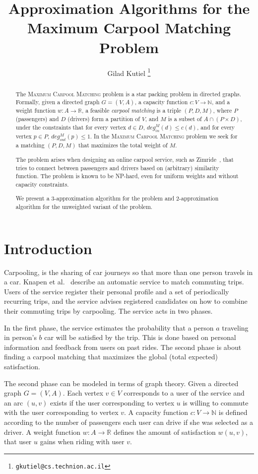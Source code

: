\documentclass[draft]{article}
\title{Approximation Algorithms for the Maximum Carpool Matching Problem}
\date{}
\author[1]{Gilad Kutiel			\thanks{\texttt{gkutiel@cs.technion.ac.il}}}
\affil[1]{Department of Computer Science, Technion, Haifa, Israel}
\def\R{\mathbb{R}}
\def\N{\mathbb{N}}
\newcommand{\din}[1][M]{deg^M_{in}}
\newcommand{\dout}[1][M]{deg^M_{out}}
\def\CARPOOL{Maximum Carpool Ma\-tching}
\begin{document}
\maketitle

\begin{abstract}
The \textsc{\CARPOOL{}} problem is a star packing problem in directed graphs.
Formally, given a directed graph $G = (V, A)$,
a capacity function $ c: V \rightarrow \N $,
and a weight function $w : A \rightarrow \R $,
a feasible \emph{carpool matching} is a triple 
$(P, D, M)$, where $P$ (passengers) and $D$ (drivers) form a partition of $V$, 
and $M$ is a subset of $A \cap (P \times D)$,
under the constraints that for every vertex $d \in D$, 
$\din(d) \leq c(d)$, 
and for every vertex $p \in P$, $\dout(p) \leq 1$.
In the \textsc{\CARPOOL{}} problem we seek for a matching $(P, D, M)$ that maximizes the
total weight of $M$.

The problem arises when designing an online carpool service, 
such as Zimride~\cite{zimride}, 
that tries to connect between passengers and drivers based on (arbitrary) similarity function.
The problem is known to be NP-hard, 
even for uniform weights and without capacity constraints.

We present a $3$-approximation algorithm for the problem
and $2$-approximation algorithm for the unweighted variant of the problem.
\end{abstract}

\section{Introduction}
Carpooling, is the sharing of car journeys so that more than one person travels
in a car.
Knapen et al.~\cite{knapen2013estimating} describe an automatic service
to match commuting trips.
Users of the service register their personal profile and a set of periodically
recurring trips, 
and the service advises registered candidates on how to combine their commuting
trips by carpooling.
The service acts in two phases. 

In the first phase, the service estimates the probability that a person $a$
traveling in person's $b$ car will be satisfied by the trip.
This is done based on personal information and feedback from users on past
rides.
The second phase is about finding a carpool matching
that maximizes the global (total expected) satisfaction.

The second phase can be modeled in terms of graph theory.
Given a directed graph $G = (V, A)$.
Each vertex $v \in V$ corresponds to a user of the service and an arc
$(u, v)$ exists if the user corresponding to vertex $u$ is willing to
commute with the user corresponding to vertex $v$.
A capacity function $ c: V \rightarrow \N $ is defined
according to the number of passengers each user can drive if she was
selected as a driver.
A weight function $w : A \rightarrow \R $ defines the amount of
satisfaction $w(u, v)$,
that user $u$ gains when riding with user $v$.
\end{document}
